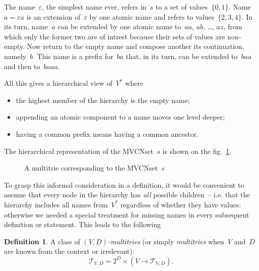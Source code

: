 \documentclass{article}
\theoremstyle{definition}
\newtheorem{Df}{Definition}
\newcommand{\setcharmt}{T}
\newcommand{\setsymbol}[3]{\mathcal{#1}_{#2,#3}}
\newcommand{\setmt}[2]{\setsymbol{\setcharmt}{#1}{#2}}
\begin{document}
The name~$\varepsilon$, the simplest name ever, refers in~$s$ to a set of
values~$\{0,1\}$. Name~$a=\varepsilon a$ is an extension of~$\varepsilon$ by
one atomic name and refers to values~$\{2,3,4\}$. In its turn, name~$a$ can
be extended by one atomic name to~$aa$, $ab$, \ldots, $az$, from which only the
former two are of intrest because their sets of values are non-empty.
Now return to the empty name and compose another its continuation, namely~$b$.
This name is a prefix for~$ba$ that, in its turn, can be extended to~$baa$ and
then to~$baaa$.

All this gives a hierarchical view of~$V^\ast$ where
\begin{itemize}
\item the highest member of the hierarchy is the empty name;
\item appending an atomic component to a name moves one level deeper;
\item having a common prefix means having a common ancestor.
\end{itemize}
The hierarchical representation of the MVCNset~$s$ is shown on the
fig.~\ref{fig:trie}.

\begin{figure}[ht]
\begin{center}
\begin{minipage}{17em}
\end{minipage}
\end{center}
\caption{A multitrie corresponding to the MVCNset~$s$}\label{fig:trie}
\end{figure}

To grasp this informal consideration in a definition, it would be convenient to
assume that every node in the hierarchy has \emph{all} possible children~-- i.e.
that the hierarchy includes all names from~$V^\ast$ regardless of whether they
have values: otherwise we needed a special treatment for missing names in
every subsequent definition or statement. This leads to the following

\begin{Df}\label{df:mt}
A class of \emph{$(V,D)$-multitries} (or simply \emph{multitries} when~$V$
and~$D$ are known from the context or irrelevant):
\[
  \setmt{V}{D} = 2^D \times (V \to \setmt{V}{D}) .
\]
\end{Df}
\end{document}
